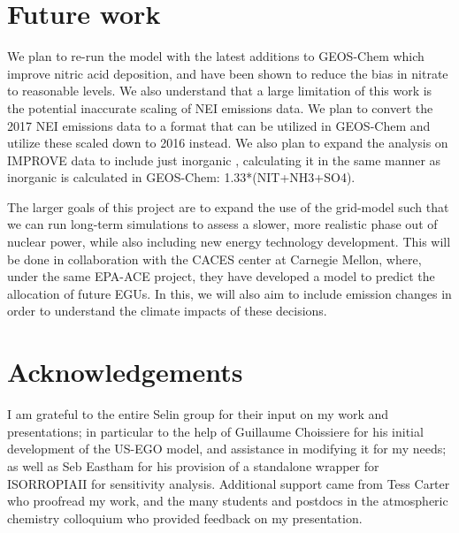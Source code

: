 \documentclass[12]{article}
\begin{document}
\section{Future work}
We plan to re-run the model with the latest additions to GEOS-Chem which improve nitric acid deposition, and have been shown to reduce the bias in nitrate to reasonable levels. We also understand that a large limitation of this work is the potential inaccurate scaling of NEI emissions data. We plan to convert the 2017 NEI emissions data to a format that can be utilized in GEOS-Chem and utilize these scaled down to 2016 instead. We also plan to expand the analysis on IMPROVE data to include just inorganic , calculating it in the same manner as inorganic  is calculated in GEOS-Chem: 1.33*(NIT+NH3+SO4). 

The larger goals of this project are to expand the use of the grid-model such that we can run long-term simulations to assess a slower, more realistic phase out of nuclear power, while also including new energy technology development. This will be done in collaboration with the CACES center at Carnegie Mellon, where, under the same EPA-ACE project, they have developed a model to predict the allocation of future EGUs. In this, we will also aim to include  emission changes in order to understand the climate impacts of these decisions.

\section{Acknowledgements}
I am grateful to the entire Selin group for their input on my work and presentations; in particular to the help of Guillaume Choissiere for his initial development of the US-EGO model, and assistance in modifying it for my needs; as well as Seb Eastham for his provision of a standalone wrapper for ISORROPIAII for sensitivity analysis. Additional support came from Tess Carter who proofread my work, and the many students and postdocs in the atmospheric chemistry colloquium who provided feedback on my presentation. 

\pagebreak


\end{document}
